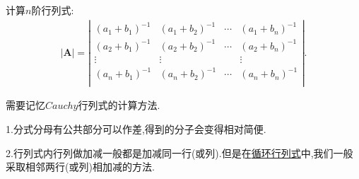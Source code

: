 \documentclass[lang=cn,newtx,10pt,scheme=chinese]{elegantbook}
\begin{document}
\begin{proposition}\label{Cauchy行列式}
    计算$n$阶行列式:
    \begin{gather}
        |\boldsymbol{A}|=\left| \begin{matrix}
            (a_1+b_1)^{-1}&		(a_1+b_2)^{-1}&		\cdots&		(a_1+b_n)^{-1}\\
            (a_2+b_1)^{-1}&		(a_2+b_2)^{-1}&		\cdots&		(a_2+b_n)^{-1}\\
            \vdots&		\vdots&		&		\vdots\\
            (a_n+b_1)^{-1}&		(a_n+b_2)^{-1}&		\cdots&		(a_n+b_n)^{-1}\\
        \end{matrix} \right|.
        \nonumber
    \end{gather}
\end{proposition}
\begin{note}
    需要记忆$Cauchy$行列式的计算方法.

1.分式分母有公共部分可以作差,得到的分子会变得相对简便.

2.行列式内行列做加减一般都是加减同一行(或列).但是在\hyperlink{循环行列式}{循环行列式}中,我们一般采取相邻两行(或列)相加减的方法.
\end{note}
\end{document}
